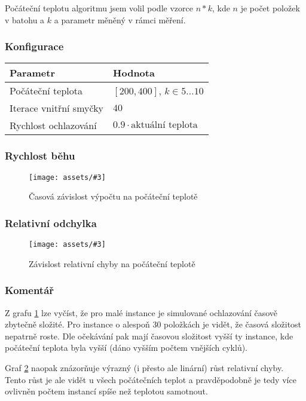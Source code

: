 \documentclass[czech]{article}
\newcommand{\image}[3]{
    \begin{figure}[H]
        \centering
        \texttt{[image: assets/\#3]}
        \caption{#2}
        \label{fig:#1}
    \end{figure}
}
\begin{document}
Počáteční teplotu algoritmu jsem volil podle vzorce $n*k$, kde $n$ je počet položek v batohu a $k$ a parametr měněný v rámci měření.

\subsubsection*{Konfigurace}

\begin{tabular}{ | l | l | }
    \hline
    Parametr & Hodnota \\ \hline \hline
    Počáteční teplota & $[200, 400]$, $k \in 5\dots10$ \\
    Iterace vnitřní smyčky & $40$ \\
    Rychlost ochlazování & $0.9 \cdot \textrm{aktuální teplota}$ \\ \hline
\end{tabular}

\subsubsection*{Rychlost běhu}

\image{dur-initial-temperature}{Časová závislost výpočtu na počáteční teplotě}{dur-initial-temperature.png}

\subsubsection*{Relativní odchylka}

\image{acc-initial-temperature}{Závislost relativní chyby na počáteční teplotě}{acc-initial-temperature.png}

\subsubsection*{Komentář}

Z grafu \ref{fig:dur-initial-temperature} lze vyčíst, že pro malé instance je simulované ochlazování časově zbytečně složité.
Pro instance o alespoň 30 položkách je vidět, že časová složitost nepatrně roste.
Dle očekávání pak mají časovou složitost vyšší ty instance, kde počáteční teplota byla vyšší (dáno vyšším počtem vnějších cyklů).

Graf \ref{fig:acc-initial-temperature} naopak znázorňuje výrazný (i přesto ale linární) růst relativní chyby.
Tento růst je ale vidět u všech počátečních teplot a pravděpodobně je tedy více ovlivněn počtem instancí spíše než teplotou samotnout.
\end{document}
